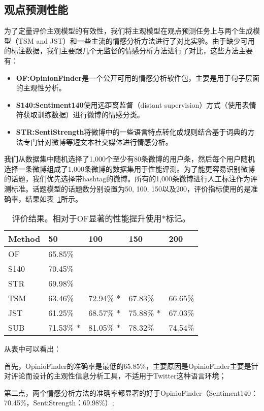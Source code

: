 \subsection{观点预测性能}
为了定量评价主观模型的有效性，我们将主观模型在观点预测任务上与两个生成模型（TSM and JST）和一些主流的情感分析方法进行了对比实验。由于缺少可用的标注数据，我们主要跟几个无监督的情感分析方法进行了对比，这些方法主要有：
\begin{itemize}
\item \textbf{OF:OpinionFinder}是一个公开可用的情感分析软件包，主要是用于句子层面的主观性分析。
\item \textbf{S140:Sentiment140}使用远距离监督（distant supervision）方式（使用表情符获取训练数据）进行微博的情感分类。
\item \textbf{STR:SentiStrength}将微博中的一些语言特点转化成规则结合基于词典的方法专门针对微博等短文本社交媒体进行情感分析。
\end{itemize}

我们从数据集中随机选择了1,000个至少有80条微博的用户条，然后每个用户随机选择一条微博组成了1,000条微博的数据集用于性能评测。为了能更容易识别微博的话题，我们优先选择带hashtag的微博。所有的1,000条微博进行人工标注作为评测标准。话题模型的话题数分别设置为50, 100, 150以及200，评价指标使用的是准确率，结果如表~\ref{tab5-2}所示。

\begin{table}[htb]
\centering
\caption{评价结果。相对于OF显著的性能提升使用$ \ast $标记。}
\label{tab5-2}
\begin{tabular}{l|llll}
\hline
Method & 50 & 100 & 150 & 200\\
\hline
OF &  65.85\%& & & \\
S140 &  70.45\%& & & \\
STR &  69.98\%& & & \\
TSM & 63.46\%& 72.94\% $ \ast $  &67.83\% & 66.65\% \\
JST & 61.25\% & 68.57\% $ \ast $ & 75.88\%  $ \ast $ & 67.03\%\\
SUB & 71.53\% $ \ast $ & 81.05\% $ \ast $ & 78.32\% & 74.54\%\\
\hline
\end{tabular}
\end{table}

从表中可以看出：

首先，OpinioFinder的准确率是最低的65.85\%，主要原因是OpinioFinder主要是针对评论而设计的主观性信息分析工具，不适用于Twitter这种语言环境；

第二点，两个情感分析方法的准确率都显著的好于OpinioFinder（Sentiment140：70.45\%，SentiStrength：69.98\%）;

